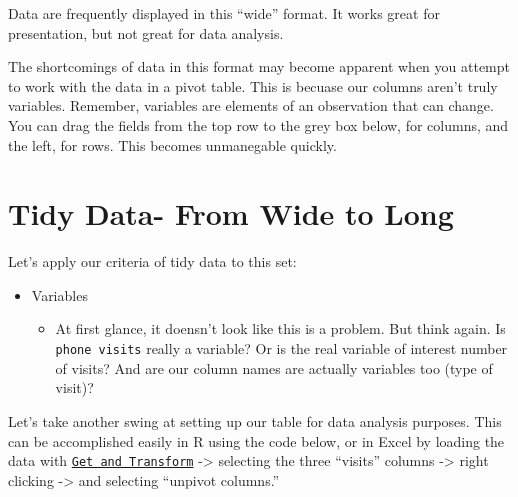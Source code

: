 \documentclass[]{book}
\newenvironment{Shaded}{\begin{snugshade}}{\end{snugshade}}
\newcommand{\DataTypeTok}[1]{\textcolor[rgb]{0.13,0.29,0.53}{#1}}
\newcommand{\KeywordTok}[1]{\textcolor[rgb]{0.13,0.29,0.53}{\textbf{#1}}}
\newcommand{\NormalTok}[1]{#1}
\newcommand{\OperatorTok}[1]{\textcolor[rgb]{0.81,0.36,0.00}{\textbf{#1}}}
\newcommand{\StringTok}[1]{\textcolor[rgb]{0.31,0.60,0.02}{#1}}
\providecommand{\tightlist}{%
  \setlength{\itemsep}{0pt}\setlength{\parskip}{0pt}}
\begin{document}
\hypertarget{htmlwidget-c22785c33baf02244872}{}

Data are frequently displayed in this ``wide'' format. It works great for presentation, but not great for data analysis.

The shortcomings of data in this format may become apparent when you attempt to work with the data in a pivot table. This is becuase our columns aren't truly variables. Remember, variables are elements of an observation that can change. You can drag the fields from the top row to the grey box below, for columns, and the left, for rows. This becomes unmanegable quickly.

\begin{Shaded}
\end{Shaded}

\hypertarget{htmlwidget-c03bd9bb730bcc215da5}{}

\hypertarget{tidy-data--from-wide-to-long}{%
\section{Tidy Data- From Wide to Long}\label{tidy-data--from-wide-to-long}}

Let's apply our criteria of tidy data to this set:

\begin{itemize}
\tightlist
\item
  Variables

  \begin{itemize}
  \tightlist
  \item
    At first glance, it doensn't look like this is a problem. But think again. Is \texttt{phone\ visits} really a variable? Or is the real variable of interest number of visits? And are our column names are actually variables too (type of visit)?
  \end{itemize}
\end{itemize}

Let's take another swing at setting up our table for data analysis purposes. This can be accomplished easily in R using the code below, or in Excel by loading the data with \href{https://support.microsoft.com/en-us/office/unpivot-columns-power-query-0f7bad4b-9ea1-49c1-9d95-f588221c7098}{\texttt{Get\ and\ Transform}} -\textgreater{} selecting the three ``visits'' columns -\textgreater{} right clicking -\textgreater{} and selecting ``unpivot columns.''
\end{document}
